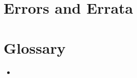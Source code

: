 \documentclass[letterpaper,10pt,english]{sphinxmanual}
\begin{document}
\chapter{Errors and Errata}
\label{\detokenize{errata:errors-and-errata}}\label{\detokenize{errata::doc}}

\chapter{Glossary}
\label{\detokenize{index:glossary}}\begin{itemize}
\item {} 
\sphinxAtStartPar
{}

\end{itemize}



\renewcommand{\indexname}{Index}
\printindex
\end{document}
